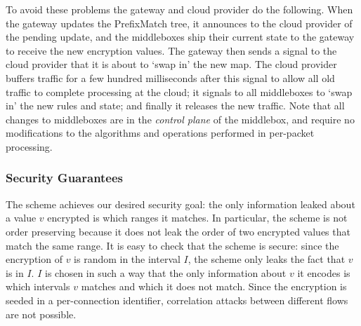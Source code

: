 To avoid these problems the gateway and cloud provider do the following. 
When the gateway updates the PrefixMatch tree, it announces to the cloud provider of the pending update, and the middleboxes ship their current state to the gateway to receive the new encryption values.
The gateway then sends a signal to the cloud provider that it is about to `swap in' the new map. 
The cloud provider buffers traffic for a few hundred milliseconds after this signal to allow all old traffic to complete processing at the cloud; it signals to all middleboxes to `swap in' the new rules and state; and finally it releases the new traffic.
Note that all changes to middleboxes are in the {\it control plane} of the middlebox, and require no modifications to the algorithms and operations performed in per-packet processing. 

\subsubsection{Security Guarantees}
The scheme achieves our desired security goal: the only information leaked about a value $v$ encrypted is which ranges it matches. 
In particular, the scheme is not order preserving because it does not leak the order of two encrypted values that match the same range. It is easy to check that the scheme is secure: since the encryption of $v$ is random in the interval $I$, the scheme only leaks the fact that $v$ is in $I$. $I$ is chosen in such a way that the only information about $v$ it encodes is which intervals $v$ matches and which it does not match. 
%
Since the encryption is seeded in a per-connection identifier, correlation attacks between different flows are not possible. 

